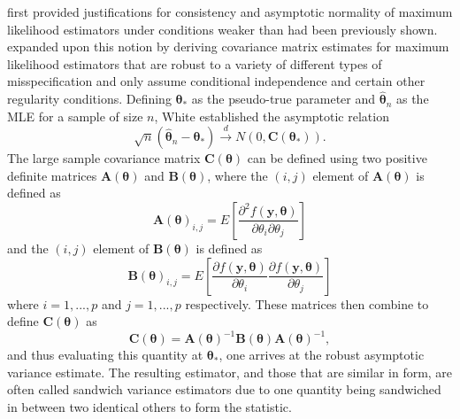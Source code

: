\documentclass[review]{elsarticle}
\begin{document}
		\citet{Huber} first provided justifications for consistency and asymptotic normality of maximum likelihood estimators under conditions weaker than had been previously shown. \citet{White1982}
		expanded upon this notion by deriving covariance matrix estimates for maximum likelihood estimators that are robust to a variety of different types of misspecification and only assume
		conditional independence and certain other regularity conditions. Defining $\bm{\theta}_*$ as the pseudo-true parameter and $\hat{\bm{\theta}}_n$ as the MLE for a sample of size
		$n$, White established the asymptotic relation
		\begin{equation*}
			\sqrt{n} (\hat{\bm{\theta}}_n - \bm{\theta}_*) \xrightarrow[]{d} N(0, \bm{C}(\bm{\theta}_* ) ) .
		\end{equation*}
		The large sample covariance matrix $\bm{C}(\bm{\theta})$ can be defined using two positive definite matrices $\bm{A}(\bm{\theta})$ and $\bm{B}(\bm{\theta})$, where the $(i,j)$ element of $\bm{A}(\bm{\theta})$ is defined as
		\begin{equation*}
			\bm{A}(\bm{\theta})_{i,j} = E \left[ \frac{\partial^2 f(\bm{y},\bm{\theta})}{\partial \theta_i \partial \theta_j} \right] 
		\end{equation*}
		and the $(i,j)$ element of $\bm{B}(\bm{\theta})$ is defined as
		\begin{equation*}
			\bm{B}(\bm{\theta})_{i,j} = E \left[ \frac{\partial f(\bm{y},\bm{\theta})}{\partial \theta_i} \frac{\partial f(\bm{y},\bm{\theta})}{\partial \theta_j} \right] 
		\end{equation*}
		where $i = 1,...,p$ and $j = 1,...,p$ respectively. These matrices then combine to define $\bm{C}(\bm{\theta})$ as
		\begin{equation*}
			\bm{C}(\bm{\theta}) = \bm{A}(\bm{\theta})^{-1} \bm{B}(\bm{\theta}) \bm{A}(\bm{\theta})^{-1} ,
		\end{equation*}
		and thus evaluating this quantity at $\bm{\theta}_*$, one arrives at the robust asymptotic variance estimate. The resulting estimator, and those that are similar in form, are often called sandwich
		variance estimators due to one quantity being sandwiched in between two identical others to form the statistic.
\end{document}
